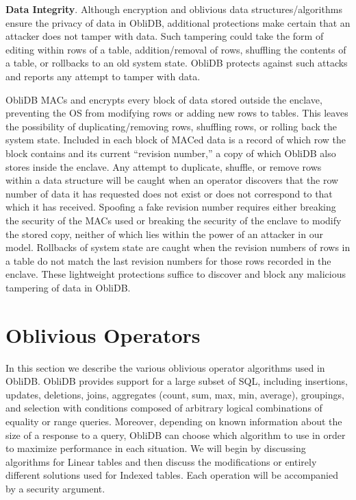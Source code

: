 \documentclass[letterpaper,twocolumn,10pt]{article}
\def\name/{ObliDB}
\begin{document}
 \noindent \textbf{Data Integrity}.
Although encryption and oblivious data structures/algorithms ensure the privacy of data in \name/, additional protections make certain that an attacker does not tamper with data. Such tampering could take the form of editing within rows of a table, addition/removal of rows, shuffling the contents of a table, or rollbacks to an old system state. \name/ protects against such attacks and reports any attempt to tamper with data.

\name/ MACs and encrypts every block of data stored outside the enclave, preventing the OS from modifying rows or adding new rows to tables. This leaves the possibility of duplicating/removing rows, shuffling rows, or rolling back the system state. Included in each block of MACed data is a record of which row the block contains and its current ``revision number,'' a copy of which \name/ also stores inside the enclave. Any attempt to duplicate, shuffle, or remove rows within a data structure will be caught when an operator discovers that the row number of data it has requested does not exist or does not correspond to that which it has received. Spoofing a fake revision number requires either breaking the security of the MACs used or breaking the security of the enclave to modify the stored copy, neither of which lies within the power of an attacker in our model. Rollbacks of system state are caught when the revision numbers of rows in a table do not match the last revision numbers for those rows recorded in the enclave. These lightweight protections suffice to discover and block any malicious tampering of data in \name/.

\section{Oblivious Operators}\label{oblivOps}
In this section we describe the various oblivious operator algorithms used in \name/. \name/ provides support for a large subset of SQL, including insertions, updates, deletions, joins, aggregates (count, sum, max, min, average), groupings, and selection with conditions composed of arbitrary logical combinations of equality or range queries. Moreover, depending on known information about the size of a response to a query, \name/ can choose which algorithm to use in order to maximize performance in each situation. We will begin by discussing algorithms for Linear tables and then discuss the modifications or entirely different solutions used for Indexed tables. Each operation will be accompanied by a security argument.
\end{document}
